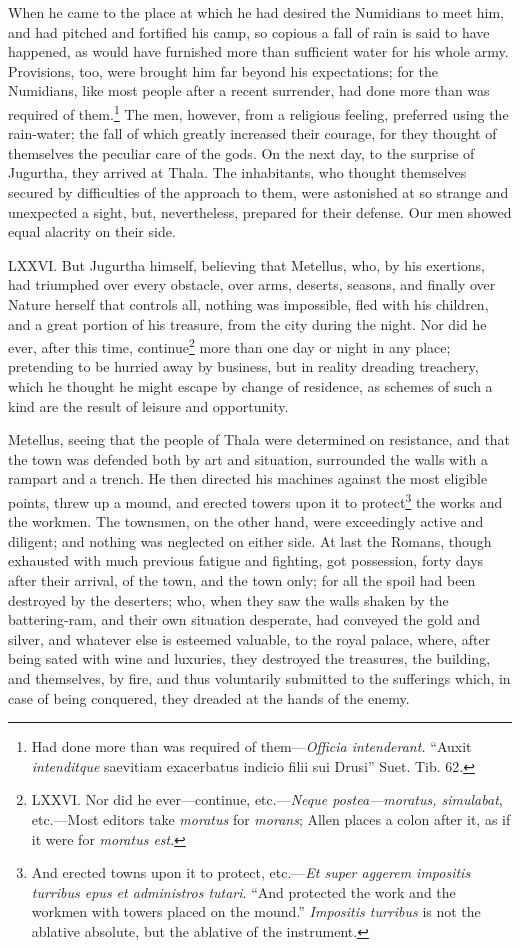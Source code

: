 When he came to the place at which he had desired the Numidians to
meet him, and had pitched and fortified his camp, so copious a fall of
rain is said to have happened, as would have furnished more than
sufficient water for his whole army. Provisions, too, were brought him
far beyond his expectations; for the Numidians, like most people after
a recent surrender, had done more than was required of them.\footnote{Had done more than was required of them—\emph{Officia intenderant.}
``Auxit \emph{intenditque} saevitiam exacerbatus indicio filii sui Drusi''
Suet. Tib. 62.} The
men, however, from a religious feeling, preferred using the
rain-water; the fall of which greatly increased their courage, for
they thought of themselves the peculiar care of the gods. On the next
day, to the surprise of Jugurtha, they arrived at Thala. The
inhabitants, who thought themselves secured by difficulties of the
approach to them, were astonished at so strange and unexpected a
sight, but, nevertheless, prepared for their defense. Our men showed
equal alacrity on their side.

LXXVI. But Jugurtha himself, believing that Metellus, who, by his
exertions, had triumphed over every obstacle, over arms, deserts,
seasons, and finally over Nature herself that controls all, nothing
was impossible, fled with his children, and a great portion of his
treasure, from the city during the night. Nor did he ever, after this
time, continue\footnote{LXXVI. Nor did he ever—continue, etc.—\emph{Neque postea—moratus,
simulabat}, etc.—Most editors take \emph{moratus} for \emph{morans}; Allen
places a colon after it, as if it were for \emph{moratus est}.} more than one day or night in any place;
pretending to be hurried away by business, but in reality dreading
treachery, which he thought he might escape by change of residence, as
schemes of such a kind are the result of leisure and opportunity.

Metellus, seeing that the people of Thala were determined on
resistance, and that the town was defended both by art and situation,
surrounded the walls with a rampart and a trench. He then directed his
machines against the most eligible points, threw up a mound, and
erected towers upon it to protect\footnote{And erected towns upon it to protect, etc.—\emph{Et super aggerem
impositis turribus epus et administros tutari}. ``And protected
the work and the workmen with towers placed on the mound.'' \emph{Impositis
turribus} is not the ablative absolute, but the ablative of the
instrument.} the works and the workmen. The
townsmen, on the other hand, were exceedingly active and diligent; and
nothing was neglected on either side. At last the Romans, though
exhausted with much previous fatigue and fighting, got possession,
forty days after their arrival, of the town, and the town only; for
all the spoil had been destroyed by the deserters; who, when they saw
the walls shaken by the battering-ram, and their own situation
desperate, had conveyed the gold and silver, and whatever else is
esteemed valuable, to the royal palace, where, after being sated with
wine and luxuries, they destroyed the treasures, the building, and
themselves, by fire, and thus voluntarily submitted to the sufferings
which, in case of being conquered, they dreaded at the hands of the
enemy.

